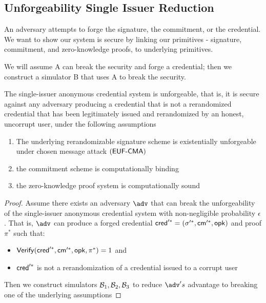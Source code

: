 

























\subsection{Unforgeability Single Issuer Reduction}
An adversary attempts to forge the signature, the commitment, or the credential. 
We want to show our system is secure by linking our primitives - signature, commitment, and zero-knowledge proofs, to underlying primitives.

We will assume A can break the security and forge a credential; then we construct a simulator B that uses A to break the security. 



\begin{theorem}
    The single-issuer anonymous credential system is unforgeable, that is, it is secure against any adversary producing a credential that is not a rerandomized credential that has been legitimately issued and rerandomized by an honest, uncorrupt user, under the following assumptions
    \begin{enumerate}
        \item The underlying rerandomizable signature scheme is existentially unforgeable under chosen message attack $(\mathsf{EUF\text{-}CMA})$
        \item the commitment scheme is computationally binding
        \item the zero-knowledge proof system is computationally sound
    \end{enumerate}
\end{theorem}

\begin{proof}
    Assume there exists an adversary $\adv$ that can break the unforgeability of the single-issuer anonymous credential system with non-negligible probability $\epsilon$. That is, $\adv$ can produce a forged credential $\mathsf{cred}'^* = (\sigma'^*, \mathsf{cm}'^*, \mathsf{opk})$ and proof $\pi^*$ such that:
    \begin{itemize}
        \item $\mathsf{Verify}(\mathsf{cred}'^*, \mathsf{cm}'^*, \mathsf{opk}, \pi^*) = 1$ and
        \item $\mathsf{cred}'^*$ is not a rerandomization of a credential issued to a corrupt user 
    \end{itemize}
    Then we construct simulators $\mathcal{B}_1, \mathcal{B}_2, \mathcal{B}_3$ to reduce $\adv's$ advantage to breaking one of the underlying assumptions
\end{proof}

